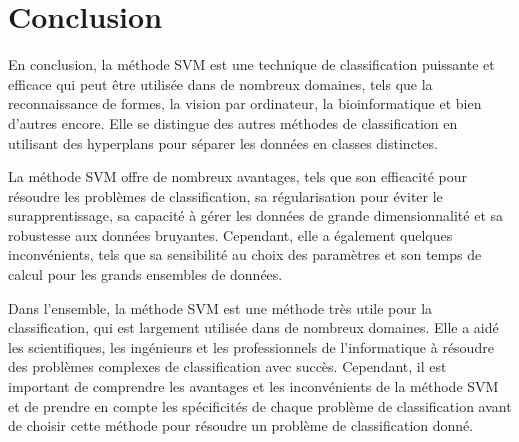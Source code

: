 \documentclass[12pt,a4paper]{report}
\begin{document}
\chapter*{Conclusion}
En conclusion, la méthode SVM est une technique de classification puissante et efficace qui peut être utilisée dans de nombreux domaines, tels que la reconnaissance de formes, la vision par ordinateur, la bioinformatique et bien d'autres encore. Elle se distingue des autres méthodes de classification en utilisant des hyperplans pour séparer les données en classes distinctes.

La méthode SVM offre de nombreux avantages, tels que son efficacité pour résoudre les problèmes de classification, sa régularisation pour éviter le surapprentissage, sa capacité à gérer les données de grande dimensionnalité et sa robustesse aux données bruyantes. Cependant, elle a également quelques inconvénients, tels que sa sensibilité au choix des paramètres et son temps de calcul pour les grands ensembles de données.

Dans l'ensemble, la méthode SVM est une méthode très utile pour la classification, qui est largement utilisée dans de nombreux domaines. Elle a aidé les scientifiques, les ingénieurs et les professionnels de l'informatique à résoudre des problèmes complexes de classification avec succès. Cependant, il est important de comprendre les avantages et les inconvénients de la méthode SVM et de prendre en compte les spécificités de chaque problème de classification avant de choisir cette méthode pour résoudre un problème de classification donné.

		
		
		
	
\end{document}
